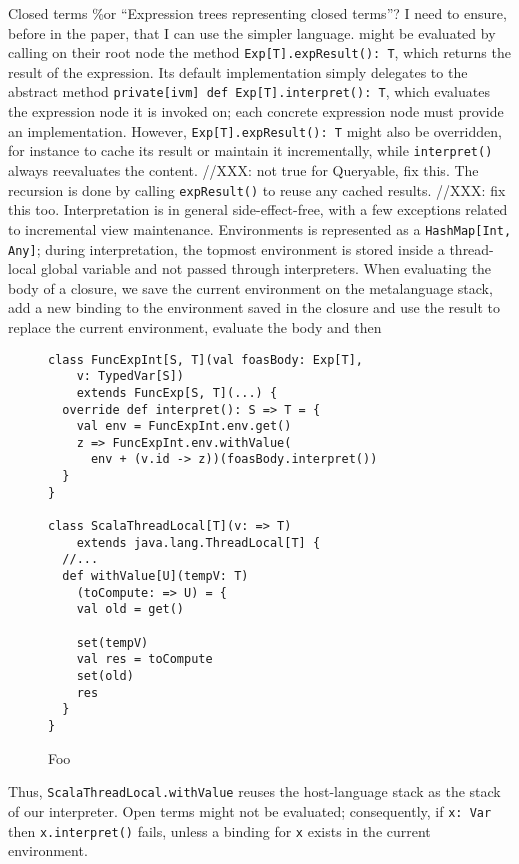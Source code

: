 \documentclass[preprint,authoryear,10pt]{sigplanconf}
\begin{document}
Closed terms \%or ``Expression trees representing closed terms''? I need
to ensure, before in the paper, that I can use the simpler language.
might be evaluated by calling on their root node the method
\texttt{Exp{[}T{]}.expResult(): T}, which returns the result of the
expression. Its default implementation simply delegates to the abstract
method \texttt{private{[}ivm{]} def Exp{[}T{]}.interpret(): T}, which
evaluates the expression node it is invoked on; each concrete expression
node must provide an implementation. However,
\texttt{Exp{[}T{]}.expResult(): T} might also be overridden, for
instance to cache its result or maintain it incrementally, while
\texttt{interpret()} always reevaluates the content. //XXX: not true for
Queryable, fix this. The recursion is done by calling
\texttt{expResult()} to reuse any cached results. //XXX: fix this too.
Interpretation is in general side-effect-free, with a few exceptions
related to incremental view maintenance. Environments is represented as
a \texttt{HashMap{[}Int, Any{]}}; during interpretation, the topmost
environment is stored inside a thread-local global variable and not
passed through interpreters. When evaluating the body of a closure, we
save the current environment on the metalanguage stack, add a new
binding to the environment saved in the closure and use the result to
replace the current environment, evaluate the body and then

\begin{figure}[t]
\begin{center}
\begin{lstlisting}
class FuncExpInt[S, T](val foasBody: Exp[T],
    v: TypedVar[S])
    extends FuncExp[S, T](...) {
  override def interpret(): S => T = {
    val env = FuncExpInt.env.get()
    z => FuncExpInt.env.withValue(
      env + (v.id -> z))(foasBody.interpret())
  }
}

class ScalaThreadLocal[T](v: => T)
    extends java.lang.ThreadLocal[T] {
  //...
  def withValue[U](tempV: T)
    (toCompute: => U) = {
    val old = get()

    set(tempV)
    val res = toCompute
    set(old)
    res
  }
}
\end{lstlisting}
\end{center}
\label{FuncExpInt}
\caption{Foo}
\end{figure}

Thus, \texttt{ScalaThreadLocal.withValue} reuses the host-language stack as
the stack of our interpreter. Open terms might not be evaluated;
consequently, if \texttt{x: Var} then %
\texttt{x.interpret()} fails,
unless a binding for \texttt{x} exists in the current environment.
\fussy
\end{document}
